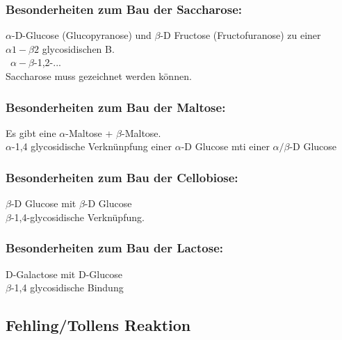 \subsubsection{Besonderheiten zum Bau der Saccharose:}
$\alpha$-D-Glucose (Glucopyranose) und $\beta$-D Fructose (Fructofuranose) zu einer $\alpha 1 -\beta 2$ glycosidischen B. \\ 
\textrightarrow\ $\alpha-\beta$-1,2-... \\
Saccharose muss gezeichnet werden können.

\subsubsection{Besonderheiten zum Bau der Maltose:}
Es gibt eine $\alpha$-Maltose + $\beta$-Maltose. \\
$\alpha$-1,4 glycosidische Verknünpfung einer $\alpha$-D Glucose mti einer $\alpha/\beta$-D Glucose

\subsubsection{Besonderheiten zum Bau der Cellobiose:}
$\beta$-D Glucose mit $\beta$-D Glucose \\
$\beta$-1,4-glycosidische Verknüpfung.

\subsubsection{Besonderheiten zum Bau der Lactose:}
D-Galactose mit D-Glucose \\
$\beta$-1,4 glycosidische Bindung

\subsection{Fehling/Tollens Reaktion}
